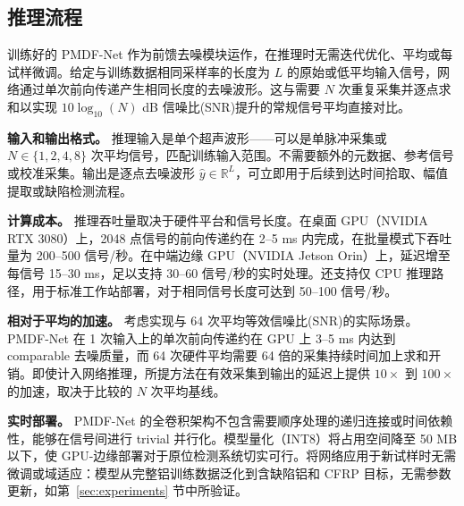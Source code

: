 \subsection{推理流程}
\label{sec:inference}

训练好的 PMDF-Net 作为前馈去噪模块运作，在推理时无需迭代优化、平均或每试样微调。给定与训练数据相同采样率的长度为 $L$ 的原始或低平均输入信号，网络通过单次前向传递产生相同长度的去噪波形。这与需要 $N$ 次重复采集并逐点求和以实现 $10\log_{10}(N)$ dB 信噪比(SNR)提升的常规信号平均直接对比。

\textbf{输入和输出格式。} 推理输入是单个超声波形——可以是单脉冲采集或 $N \in \{1, 2, 4, 8\}$ 次平均信号，匹配训练输入范围。不需要额外的元数据、参考信号或校准采集。输出是逐点去噪波形 $\hat{y} \in \mathbb{R}^L$，可立即用于后续到达时间拾取、幅值提取或缺陷检测流程。

\textbf{计算成本。} 推理吞吐量取决于硬件平台和信号长度。在桌面 GPU（NVIDIA RTX 3080）上，2048 点信号的前向传递约在 2--5 ms 内完成，在批量模式下吞吐量为 200--500 信号/秒。在中端边缘 GPU（NVIDIA Jetson Orin）上，延迟增至每信号 15--30 ms，足以支持 30--60 信号/秒的实时处理。还支持仅 CPU 推理路径，用于标准工作站部署，对于相同信号长度可达到 50--100 信号/秒。

\textbf{相对于平均的加速。} 考虑实现与 64 次平均等效信噪比(SNR)的实际场景。PMDF-Net 在 1 次输入上的单次前向传递约在 GPU 上 3--5 ms 内达到 comparable 去噪质量，而 64 次硬件平均需要 64 倍的采集持续时间加上求和开销。即使计入网络推理，所提方法在有效采集到输出的延迟上提供 $10\times$ 到 $100\times$ 的加速，取决于比较的 $N$ 次平均基线。

\textbf{实时部署。} PMDF-Net 的全卷积架构不包含需要顺序处理的递归连接或时间依赖性，能够在信号间进行 trivial 并行化。模型量化（INT8）将占用空间降至 50 MB 以下，使 GPU-边缘部署对于原位检测系统切实可行。将网络应用于新试样时无需微调或域适应：模型从完整铝训练数据泛化到含缺陷铝和 CFRP 目标，无需参数更新，如第~\ref{sec:experiments} 节中所验证。